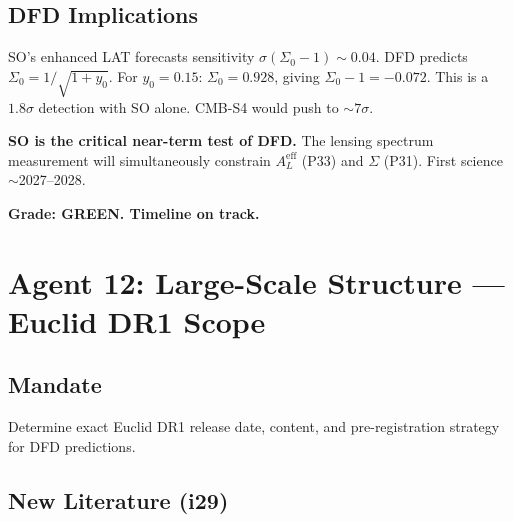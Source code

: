 \documentclass[11pt,a4paper]{article}
\begin{document}
\subsection{DFD Implications}

SO's enhanced LAT forecasts sensitivity $\sigma(\Sigma_0 - 1) \sim 0.04$. DFD predicts $\Sigma_0 = 1/\sqrt{1 + y_0}$. For $y_0 = 0.15$: $\Sigma_0 = 0.928$, giving $\Sigma_0 - 1 = -0.072$. This is a $1.8\sigma$ detection with SO alone. CMB-S4 would push to $\sim 7\sigma$.

\textbf{SO is the critical near-term test of DFD.} The lensing spectrum measurement will simultaneously constrain $A_L^\mathrm{eff}$ (P33) and $\Sigma$ (P31). First science $\sim$2027--2028.

\textbf{Grade: GREEN. Timeline on track.}

\section{Agent 12: Large-Scale Structure --- Euclid DR1 Scope}

\subsection{Mandate}
Determine exact Euclid DR1 release date, content, and pre-registration strategy for DFD predictions.

\subsection{New Literature (i29)}
\end{document}
